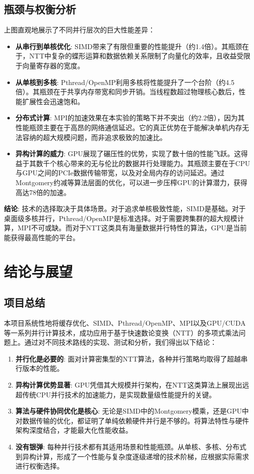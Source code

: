\documentclass[a4paper]{article}
\begin{document}
\subsection{瓶颈与权衡分析}
上图直观地展示了不同并行层次的巨大性能差异：
\begin{itemize}
    \item \textbf{从串行到单核优化}: SIMD带来了有限但重要的性能提升（约1.4倍）。其瓶颈在于，NTT中复杂的蝶形运算和数据依赖关系限制了向量化的效率，且收益受限于向量寄存器的宽度。
    \item \textbf{从单核到多核}: Pthread/OpenMP利用多核将性能提升了一个台阶（约4.5倍）。其瓶颈在于共享内存带宽和同步开销。当线程数超过物理核心数后，性能扩展性会迅速饱和。
    \item \textbf{分布式计算}: MPI的加速效果在本实验的策略下并不突出（约2.2倍），因为其性能瓶颈主要在于高昂的网络通信延迟。它的真正优势在于能解决单机内存无法容纳的超大规模问题，而非追求极致的加速比。
    \item \textbf{异构计算的威力}: GPU展现了碾压性的优势，实现了数十倍的性能飞跃。这得益于其数千个核心带来的无与伦比的数据并行处理能力。其瓶颈主要在于CPU与GPU之间的PCIe数据传输带宽，以及对全局内存的访问延迟。通过Montgomery约减等算法层面的优化，可以进一步压榨GPU的计算潜力，获得高达78倍的加速。
\end{itemize}

\textbf{结论}: 技术的选择取决于具体场景。对于追求单核极致性能，SIMD是基础。对于桌面级多核并行，Pthread/OpenMP是标准选择。对于需要跨集群的超大规模计算，MPI不可或缺。而对于NTT这类具有海量数据并行特性的算法，GPU是当前能获得最高性能的平台。

\section{结论与展望}
\subsection{项目总结}
本项目系统性地将缓存优化、SIMD、Pthread/OpenMP、MPI以及GPU/CUDA等一系列并行计算技术，成功应用于基于快速数论变换（NTT）的多项式乘法问题上。通过对不同技术路线的实现、测试和分析，我们得出以下结论：
\begin{enumerate}
    \item \textbf{并行化是必要的}: 面对计算密集型的NTT算法，各种并行策略均取得了超越串行版本的性能。
    \item \textbf{异构计算优势显著}: GPU凭借其大规模并行架构，在NTT这类算法上展现出远超传统CPU并行技术的加速能力，是实现数量级性能提升的关键。
    \item \textbf{算法与硬件协同优化是核心}: 无论是SIMD中的Montgomery模乘，还是GPU中对数据传输的优化，都证明了单纯依赖硬件并行是不够的。将算法特性与硬件架构深度结合，才能最大化性能收益。
    \item \textbf{没有银弹}: 每种并行技术都有其适用场景和性能瓶颈。从单核、多核、分布式到异构计算，形成了一个性能与复杂度逐级递增的技术阶梯，应根据实际需求进行权衡选择。
\end{enumerate}
\end{document}

